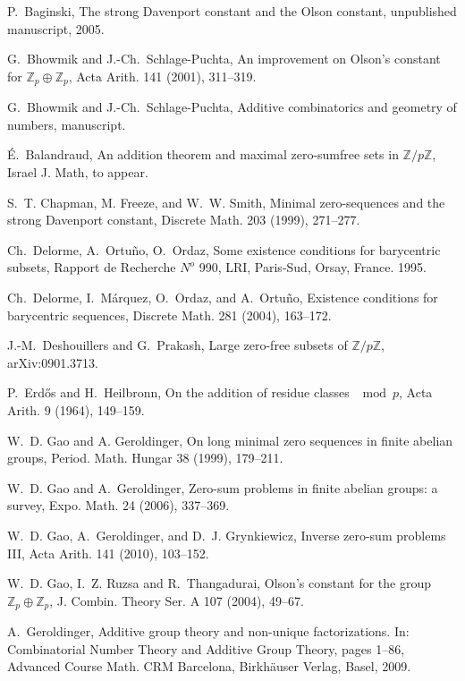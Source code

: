\documentclass{amsart}
\theoremstyle{definition}
\numberwithin{equation}{section}
\begin{document}
\begin{thebibliography}{99}

 P.~Baginski, The strong Davenport constant and the Olson
constant, unpublished manuscript, 2005.

 G.~Bhowmik and J.-Ch.~Schlage-Puchta, An improvement on Olson's constant for $\mathbb{Z}_p \oplus \mathbb{Z}_p$, Acta Arith. 141 (2001), 311--319.

 G.~Bhowmik and J.-Ch.~Schlage-Puchta, Additive combinatorics and geometry of numbers, manuscript.

 {\'E}.~Balandraud, An addition theorem and maximal zero-sumfree sets in $\mathbb{Z}/p\mathbb{Z}$, Israel J. Math, to appear.

 S.~T. Chapman, M. Freeze, and W.~W. Smith,
 Minimal zero-sequences and the strong Davenport constant,  Discrete Math. 203 (1999), 271--277.

 Ch.~Delorme, A.~Ortu\~no, O.~Ordaz,
 Some existence conditions for barycentric subsets, Rapport
de Recherche $N^o$ 990, LRI, Paris-Sud, Orsay, France. 1995.

 Ch.~Delorme, I.~M\'arquez, O.~Ordaz, and A.~Ortu\~no, Existence conditions for barycentric sequences,  Discrete Math. 281 (2004), 163--172.

 J.-M.~Deshouillers and G.~Prakash, Large zero-free subsets of $\mathbb{Z}/p\mathbb{Z}$, arXiv:0901.3713.

 P.~Erd{\H o}s and H.~Heilbronn, On the addition of residue classes $\mod p$,  Acta Arith. 9 (1964), 149--159.

 W.~D. Gao and A. Geroldinger, On long minimal zero sequences in finite abelian groups,  Period. Math. Hungar 38 (1999), 179--211.

 W.~D. Gao and A.~Geroldinger, Zero-sum problems in
finite abelian groups: a survey, Expo. Math. 24 (2006), 337--369.

W.~D. Gao, A.~Geroldinger, and D.~J. Grynkiewicz,
Inverse zero-sum problems {III}, Acta Arith. 141 (2010), 103--152.

 W.~D. Gao, I.~Z. Ruzsa and R.~Thangadurai, Olson's
constant for the group $\mathbb{Z}_p \oplus \mathbb{Z}_p$, J. Combin. Theory Ser. A 107 (2004), 49--67.

 A.~Geroldinger, Additive group theory and non-unique factorizations. In: Combinatorial Number Theory and Additive Group Theory, pages 1--86, Advanced Course Math. CRM Barcelona, Birkh{\"a}user Verlag, Basel, 2009.


\end{thebibliography}
\end{document}
